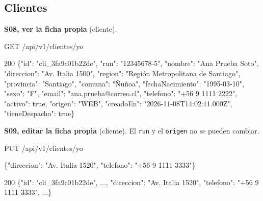 \subsection{Clientes}

\textbf{S08, ver la ficha propia} (cliente).


\begin{codigo}
GET /\allowbreak{}api/\allowbreak{}v1/\allowbreak{}clientes/\allowbreak{}yo\par
\end{codigo}

\begin{codigo}
200 \{"id":\allowbreak{} "cli\_\allowbreak{}3fa9c01b22de",\allowbreak{} "run":\allowbreak{} "12345678-\allowbreak{}5",\allowbreak{} "nombre":\allowbreak{} "Ana Prueba Soto",\allowbreak{} "direccion":\allowbreak{} "Av.\allowbreak{} Italia 1500",\allowbreak{} "region":\allowbreak{} "Región Metropolitana de Santiago",\allowbreak{} "provincia":\allowbreak{} "Santiago",\allowbreak{} "comuna":\allowbreak{} "Ñuñoa",\allowbreak{} "fechaNacimiento":\allowbreak{} "1995-\allowbreak{}03-\allowbreak{}10",\allowbreak{} "sexo":\allowbreak{} "F",\allowbreak{} "email":\allowbreak{} "ana.\allowbreak{}prueba@correo.\allowbreak{}cl",\allowbreak{} "telefono":\allowbreak{} "+56 9 1111 2222",\allowbreak{} "activo":\allowbreak{} true,\allowbreak{} "origen":\allowbreak{} "WEB",\allowbreak{} "creadoEn":\allowbreak{} "2026-\allowbreak{}11-\allowbreak{}08T14:\allowbreak{}02:\allowbreak{}11.\allowbreak{}000Z",\allowbreak{} "tieneDespacho":\allowbreak{} true\}\par
\end{codigo}

\textbf{S09, editar la ficha propia} (cliente). El \texttt{run} y el \texttt{origen} no se pueden cambiar.


\begin{codigo}
PUT /\allowbreak{}api/\allowbreak{}v1/\allowbreak{}clientes/\allowbreak{}yo\par
\{"direccion":\allowbreak{} "Av.\allowbreak{} Italia 1520",\allowbreak{} "telefono":\allowbreak{} "+56 9 1111 3333"\}\par
\end{codigo}

\begin{codigo}
200 \{"id":\allowbreak{} "cli\_\allowbreak{}3fa9c01b22de",\allowbreak{} .\allowbreak{}.\allowbreak{}.\allowbreak{},\allowbreak{} "direccion":\allowbreak{} "Av.\allowbreak{} Italia 1520",\allowbreak{} "telefono":\allowbreak{} "+56 9 1111 3333",\allowbreak{} .\allowbreak{}.\allowbreak{}.\allowbreak{}\}\par
\end{codigo}


